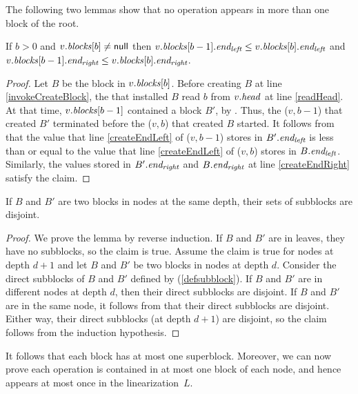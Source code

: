 The following two lemmas show that no operation appears in more than one block of the root.
\begin{lemma} \label{lem::headProgress}
 If $b>0$ and $v.\mbox{\textit{blocks}}[b] \neq \mbox{\sf null}$ then 
 $v.\mbox{\textit{blocks}}[b-1].\mbox{\textit{end\textsubscript{left}}} \leq v.\mbox{\textit{blocks}}[b].\mbox{\textit{end\textsubscript{left}}}$ and 
 $v.\mbox{\textit{blocks}}[b-1].\mbox{\textit{end\textsubscript{right}}} \leq v.\mbox{\textit{blocks}}[b].\mbox{\textit{end\textsubscript{right}}}$.
\end{lemma}
\begin{proof}
Let $B$ be the block in $v.\mbox{\textit{blocks}}[b]$.
Before creating $B$ at line \ref{invokeCreateBlock}, the  that installed $B$
read $b$ from $v.\mbox{\textit{head}}$ at line \ref{readHead}.
At that time, $v.\mbox{\textit{blocks}}[b-1]$ contained a block $B'$, by .
Thus, the ($v,b-1$) that created $B'$ terminated before the ($v,b$) that
created $B$ started.
It follows from  that the value that 
line \ref{createEndLeft} of ($v,b-1$) stores in $B'.\mbox{\textit{end\textsubscript{left}}}$   
is less than or equal to the value that line \ref{createEndLeft} of ($v,b$) 
stores in $B.\mbox{\textit{end\textsubscript{left}}}$.
Similarly, the values stored in $B'.\mbox{\textit{end\textsubscript{right}}}$ and $B.\mbox{\textit{end\textsubscript{right}}}$ at line \ref{createEndRight} 
satisfy the claim.
\end{proof}

\begin{lemma} \label{lem::subblocksDistinct}
If $B$ and $B'$ are two blocks in nodes at the same depth, their sets of subblocks are disjoint.
\end{lemma}
\begin{proof}
We prove the lemma by reverse induction.
If $B$ and $B'$ are in leaves, they have no subblocks, so the claim is true.
Assume the claim is true for nodes at depth $d+1$ and let $B$ and $B'$ be two blocks in nodes at depth $d$.
Consider the direct subblocks of $B$ and $B'$ defined by (\ref{defsubblock}).
If $B$ and $B'$ are in different nodes at depth $d$, then their direct subblocks are disjoint.
If $B$ and $B'$ are in the same node, it follows from  that their direct subblocks are disjoint.
Either way, their direct subblocks (at depth $d+1$) are disjoint, so the claim follows from the induction hypothesis.
\end{proof}

It follows that each block has at most one superblock.
Moreover, we can now prove each operation is contained in at most one block of each node,
and hence appears at most once in the linearization~$L$.

